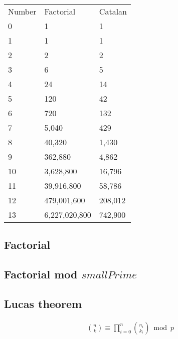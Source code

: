 \vspace{-10pt}

\begin{tabular}{ |p{1cm}|p{3cm}|p{3cm}|  }
  \hline  
  \rowcolor{Blue} 
  \multicolumn{3}{|c|}{Combinatorics table} \\ \hline
  \rowcolor{LightBlue2} 
  Number & Factorial & Catalan \\ \hline
  0 & 1 & 1 \\ \hline
  \rowcolor{Gray} 
  1 & 1 & 1 \\ \hline
  2 & 2 & 2 \\ \hline
  \rowcolor{Gray} 
  3 & 6 & 5 \\ \hline
  4 & 24 & 14 \\ \hline
  \rowcolor{Gray} 
  5 & 120 & 42 \\ \hline
  6 & 720 & 132 \\ \hline
  \rowcolor{Gray} 
  7 & 5,040 & 429 \\ \hline
  8 & 40,320 & 1,430 \\ \hline
  \rowcolor{Gray} 
  9 & 362,880 & 4,862 \\ \hline
  10 & 3,628,800 & 16,796 \\ \hline
  \rowcolor{Gray} 
  11 & 39,916,800 & 58,786 \\ \hline
  12 & 479,001,600 & 208,012 \\ \hline
  \rowcolor{Gray} 
  13 & 6,227,020,800 & 742,900 \\ \hline
\end{tabular}
\vspace{-5pt}

\subsection{Factorial} 

\subsection{Factorial mod $smallPrime$} 

\subsection{Lucas theorem}
\begin{gather*}
\binom{n}{k} \equiv \prod_{i = 0}^{n}\binom{n_i}{k_i} \bmod{p}
\end{gather*}
\vspace{-15pt}

